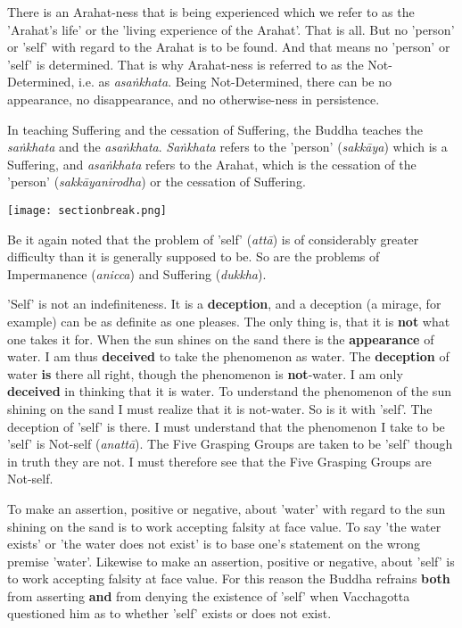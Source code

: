 There is an Arahat-ness that is being experienced which we refer to as the 'Arahat's life' or the 'living experience of the Arahat'. That is all. But no 'person' or 'self' with regard to the Arahat is to be found. And that means no 'person' or 'self' is determined. That is why Arahat-ness is referred to as the Not-Determined, i.e. as \emph{asaṅkhata}. Being Not-Determined, there can be no appearance, no disappearance, and no otherwise-ness in persistence.

In teaching Suffering and the cessation of Suffering, the Buddha teaches the \emph{saṅkhata} and the \emph{asaṅkhata}. \emph{Saṅkhata} refers to the 'person' (\emph{sakkāya}) which is a Suffering, and \emph{asaṅkhata} refers to the Arahat, which is the cessation of the 'person' (\emph{sakkāyanirodha}) or the cessation of Suffering.

\texttt{[image: sectionbreak.png]}

Be it again noted that the problem of 'self' (\emph{attā}) is of considerably greater difficulty than it is generally supposed to be. So are the problems of Impermanence (\emph{anicca}) and Suffering (\emph{dukkha}).

'Self' is not an indefiniteness. It is a \textbf{deception}, and a deception (a mirage, for example) can be as definite as one pleases. The only thing is, that it is \textbf{not} what one takes it for. When the sun shines on the sand there is the \textbf{appearance} of water. I am thus \textbf{deceived} to take the phenomenon as water. The \textbf{deception} of water \textbf{is} there all right, though the phenomenon is \textbf{not}-water. I am only \textbf{deceived} in thinking that it is water. To understand the phenomenon of the sun shining on the sand I must realize that it is not-water. So is it with 'self'. The deception of 'self' is there. I must understand that the phenomenon I take to be 'self' is Not-self (\emph{anattā}). The Five Grasping Groups are taken to be 'self' though in truth they are not. I must therefore see that the Five Grasping Groups are Not-self.

To make an assertion, positive or negative, about 'water' with regard to the sun shining on the sand is to work accepting falsity at face value. To say 'the water exists' or 'the water does not exist' is to base one's statement on the wrong premise 'water'. Likewise to make an assertion, positive or negative, about 'self' is to work accepting falsity at face value. For this reason the Buddha refrains \textbf{both} from asserting \textbf{and} from denying the existence of 'self' when Vacchagotta questioned him as to whether 'self' exists or does not exist.

